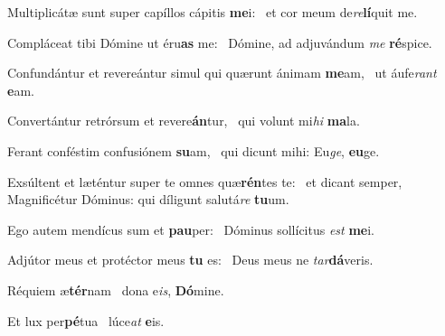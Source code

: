 \item Multiplicátæ sunt super capíllos cápitis \textbf{me}i:~\psstar{} et cor meum de\textit{re}\textbf{lí}quit me.
\item Compláceat tibi Dómine ut éru\textbf{as} me:~\psstar{} Dómine, ad adjuvándum \textit{me} \textbf{ré}spice.
\item Confundántur et revereántur simul qui quærunt ánimam \textbf{me}am,~\psstar{} ut áufe\textit{rant} \textbf{e}am.
\item Convertántur retrórsum et revere\textbf{án}tur,~\psstar{} qui volunt mi\textit{hi} \textbf{ma}la.
\item Ferant conféstim confusiónem \textbf{su}am,~\psstar{} qui dicunt mihi: Eu\textit{ge}, \textbf{eu}ge.
\item Exsúltent et læténtur super te omnes quæ\textbf{rén}tes te:~\psstar{} et dicant semper, Magnificétur Dóminus: qui díligunt salutá\textit{re} \textbf{tu}um.
\item Ego autem mendícus sum et \textbf{pau}per:~\psstar{} Dóminus sollícitus \textit{est} \textbf{me}i.
\item Adjútor meus et protéctor meus \textbf{tu} es:~\psstar{} Deus meus ne \textit{tar}\textbf{dá}veris.
\item Réquiem æ\textbf{tér}nam~\psstar{} dona e\textit{is}, \textbf{Dó}mine.
\item Et lux per\textbf{pé}tua~\psstar{} lúce\textit{at} \textbf{e}is.